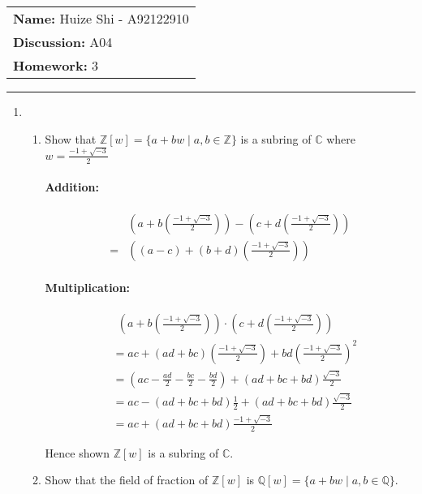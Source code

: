\documentclass[12pt]{article}
\begin{document}
\null\hfill\begin{tabular}[t]{l@{}}
	\textbf{Name: }Huize Shi - A92122910 \\
	\textbf{Discussion: }A04 \\
	\textbf{Homework: }3
\end{tabular}
\noindent\rule{\textwidth}{0.5pt}

\begin{enumerate}
	\item
	\begin{enumerate}
		\item Show that $\mathbb{Z}[w]=\{a+bw \mid a,b \in \mathbb{Z}\}$ is a
			subring of $\mathbb{C}$ where $w = \frac{-1 + \sqrt{-3}}{2}$

			\paragraph{Addition:}
				\begin{align*}
					&\left(a+b\left(\frac{-1 + \sqrt{-3}}{2}\right)\right)-
					\left(c+d\left(\frac{-1 + \sqrt{-3}}{2}\right)\right)\\
					=& \left((a-c)+(b+d)\left(\frac{-1 + \sqrt{-3}}{2}\right)\right)
				\end{align*}
			\paragraph{Multiplication:}
				\begin{align*}
					&\ \ \left(a+b\left(\frac{-1 + \sqrt{-3}}{2}\right)\right) \cdot
						\left(c+d\left(\frac{-1 + \sqrt{-3}}{2}\right)\right)\\
					&= ac + (ad+bc)\left(\frac{-1 + \sqrt{-3}}{2}\right) +
						bd\left(\frac{-1 + \sqrt{-3}}{2}\right)^2\\
					&= (ac - \frac{ad}{2} - \frac{bc}{2} - \frac{bd}{2}) +
						(ad + bc + bd)\frac{\sqrt{-3}}{2}\\
					&= ac - (ad + bc + bd)\frac{1}{2} + (ad + bc +
						bd)\frac{\sqrt{-3}}{2}\\
					&= ac + (ad + bc +
						bd)\frac{-1 + \sqrt{-3}}{2}
				\end{align*}

				Hence shown $\mathbb{Z}[w]$ is a subring of $\mathbb{C}$.\\

		\item Show that the field of fraction of $\mathbb{Z}[w]$ is
			$\mathbb{Q}[w]=\{a+bw \mid a,b \in \mathbb{Q}\}$.


	\end{enumerate}
\end{enumerate}
\end{document}
